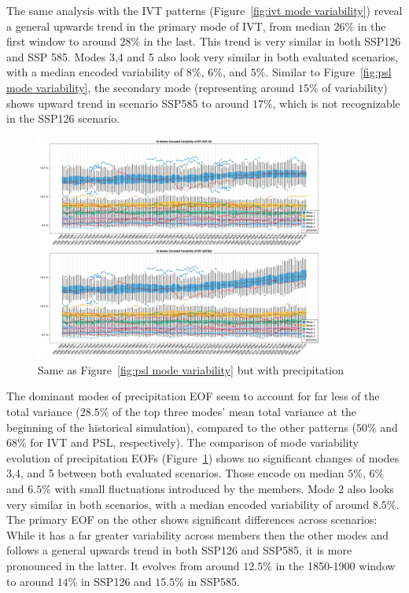 The same analysis with the IVT patterns (Figure~\ref{fig:ivt mode variability}) reveal a general upwards trend in the primary mode of IVT, from median $26\%$ in the first window to around $28\%$ in the last. 
This trend is very similar in both SSP126 and SSP 585. 
Modes 3,4 and 5 also look very similar in both evaluated scenarios, with a median encoded variability of $8\%$, $6\%$, and $5\%$. 
Similar to Figure~\ref{fig:psl mode variability}, the secondary mode (representing around $15\%$ of variability) shows upward trend in scenario SSP585 to around $17\%$, which is not recognizable in the SSP126 scenario. 

\begin{figure}[htb]
  \begin{center}
    \includegraphics[width=0.85\textwidth]{figures/mode_variability_pr_50seasons.png}
  \end{center}
  \caption{Same as Figure~\ref{fig:psl mode variability} but with precipitation}\label{fig:pr mode variability}
\end{figure}

The dominant modes of precipitation EOF seem to account for far less of the total variance ($28.5 \%$ of the top three modes' mean total variance at the beginning of the historical simulation), compared to the other patterns ($50 \%$ and $68 \%$ for IVT and PSL, respectively).  
The comparison of mode variability evolution of precipitation EOFs (Figure~\ref{fig:pr mode variability}) shows no significant changes of modes 3,4, and 5 between both evaluated scenarios. 
Those encode on median $5\%$, $6\%$ and $6.5\%$ with small fluctuations introduced by the members. 
Mode 2 also looks very similar in both scenarios, with a median encoded variability of around $8.5\%$. 
The primary EOF on the other shows significant differences across scenarios: While it has a far greater variability across members then the other modes and follows a general upwards trend in both SSP126 and SSP585, it is more pronounced in the latter. 
It evolves from around $12.5\%$ in the 1850-1900 window to around $14\%$ in SSP126 and $15.5\%$ in SSP585.  


